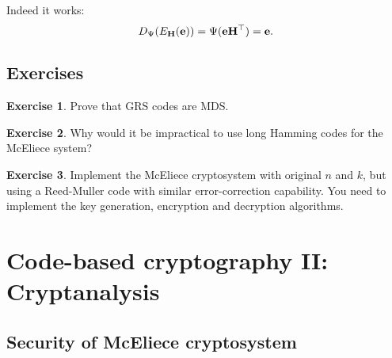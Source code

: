 \documentclass[a4paper, 11pt, openany]{book}
\numberwithin{equation}{section}
\theoremstyle{plain}
\theoremstyle{definition}
\newtheorem{exercise}   {Exercise}  [section]
\begin{document}
Indeed it works:
\[
	D_\Psi( E_{\bf H}( {\bf e} ) ) = \Psi( {\bf e}{\bf H}^\top ) = {\bf e}.
\]



\subsection{Exercises}



\begin{exercise} 
Prove that GRS codes are MDS.
\end{exercise}


\begin{exercise}
Why would it be impractical to use long Hamming codes for the McEliece system?
\end{exercise}

\begin{exercise}
Implement the McEliece cryptosystem with original $n$ and $k$, but using a Reed-Muller code with similar error-correction capability. You need to implement the key generation, encryption and decryption algorithms.
\end{exercise}




















\section{Code-based cryptography II: Cryptanalysis}
\label{sec:30}





\subsection{Security of McEliece cryptosystem}
\end{document}
